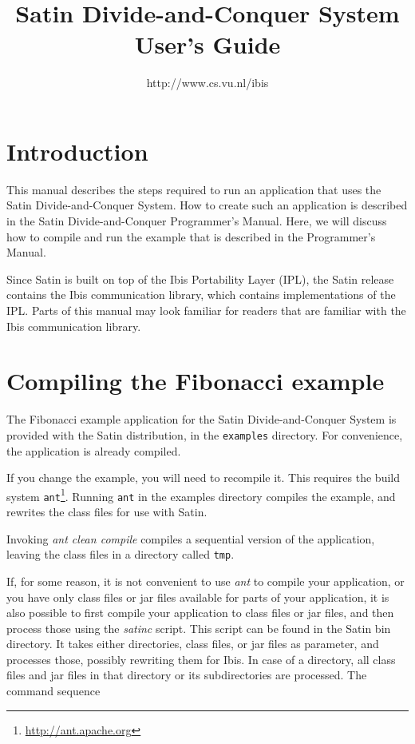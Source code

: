 \documentclass[a4paper,10pt]{article}
\begin{document}
\title{Satin Divide-and-Conquer System User's Guide}

\author{http://www.cs.vu.nl/ibis}

\maketitle

\section{Introduction}

This manual describes the steps required to run an application that
uses the Satin Divide-and-Conquer System. How to create such an application
is described in the Satin Divide-and-Conquer Programmer's Manual.
Here, we will discuss how to compile and run the example that is described
in the Programmer's Manual.

Since Satin is built on top of the Ibis Portability Layer (IPL),
the Satin release contains the Ibis communication library, which contains
implementations of the IPL. Parts of this manual may look familiar for
readers that are familiar with the Ibis communication library.

\section{Compiling the Fibonacci example}

The Fibonacci example application for the Satin Divide-and-Conquer System is
provided with the Satin distribution, in the \texttt{examples} directory.
For convenience, the application is already compiled.

If you change the example, you will need to recompile it. This
requires the build system \texttt{ant}\footnote{\url{http://ant.apache.org}}.
Running \texttt{ant} in the examples directory compiles the example,
and rewrites the class files for use with Satin.

Invoking \emph{ant clean compile} compiles a sequential version
of the application,
leaving the class files in a directory called \texttt{tmp}.

If, for some reason, it is not convenient to use \emph{ant} to compile
your application, or you have only class files or jar files available
for parts of your application, it is also possible to first compile
your application to class files or jar files, and then process those
using the \emph{satinc} script. This script can be found in the Satin
bin directory. It takes either directories, class files, or jar files
as parameter, and processes those, possibly rewriting them for Ibis.
In case of a directory, all class files and jar files in that directory or
its subdirectories are processed. The command sequence
\end{document}
